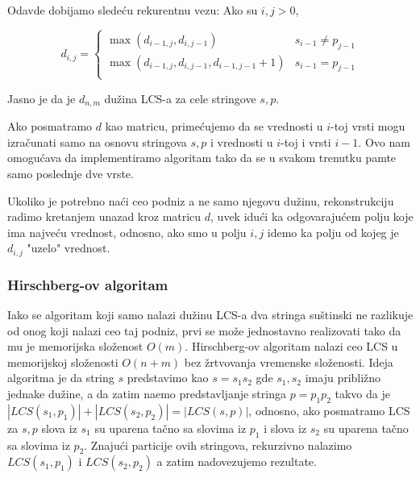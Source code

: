 Odavde dobijamo slede\' cu rekurentnu vezu: Ako su $i,j > 0$,

\begin{equation}
    d_{i,j} = \begin{cases}
        \max(d_{i-1,j}, d_{i,j-1}) & s_{i-1} \not = p_{j-1} \\
        \max(d_{i-1,j}, d_{i,j-1}, d_{i-1,j-1} + 1) &  s_{i-1} = p_{j-1} \\
    \end{cases}
\end{equation}

Jasno je da je $d_{n,m}$ du\v zina LCS-a za cele stringove $s,p$.



Ako posmatramo $d$ kao matricu, prime\' cujemo da se vrednosti u $i$-toj vrsti mogu izra\v cunati samo na osnovu stringova $s,p$ i vrednosti u $i$-toj i vrsti $i-1$. Ovo nam omogu\' cava da implementiramo algoritam tako da se u svakom trenutku pamte samo poslednje dve vrste.

\noindent
\begin{minipage}[l]{\textwidth}

\end{minipage}

Ukoliko je potrebno na\' ci ceo podniz a ne samo njegovu du\v zinu, rekonstrukciju radimo kretanjem unazad kroz matricu $d$, uvek idu\' ci ka odgovaraju\' cem polju koje ima najve\' cu vrednost, odnosno, ako smo u polju $i,j$ idemo ka polju od kojeg je $d_{i,j}$ "uzelo" vrednost.

\noindent
\begin{minipage}[l]{\textwidth}

\end{minipage}

\subsubsection{Hirschberg-ov algoritam}

Iako se algoritam koji samo nalazi du\v zinu LCS-a dva stringa su\v stinski ne razlikuje od onog koji nalazi ceo taj podniz, prvi se mo\v ze jednostavno realizovati tako da mu je memorijska slo\v zenost $O(m)$. Hirschberg-ov algoritam nalazi ceo LCS u memorijskoj slo\v zenosti $O(n+m)$ bez \v zrtvovanja vremenske slo\v zenosti.\cite{hirschbergrad} Ideja algoritma je da string $s$ predstavimo kao $s=s_1s_2$ gde $s_1,s_2$ imaju pribli\v zno jednake du\v zine, a da zatim na\dj emo predstavljanje stringa $p=p_1p_2$ takvo da je $|LCS(s_1, p_1)| + |LCS(s_2, p_2)| = |LCS(s, p)|$, odnosno, ako posmatramo LCS za $s,p$ slova iz $s_1$ su uparena ta\v cno sa slovima iz $p_1$ i slova iz $s_2$ su uparena ta\v cno sa slovima iz $p_2$. Znaju\' ci particije ovih stringova, rekurzivno nalazimo $LCS(s_1, p_1)$ i $LCS(s_2, p_2)$ a zatim nadovezujemo rezultate.

